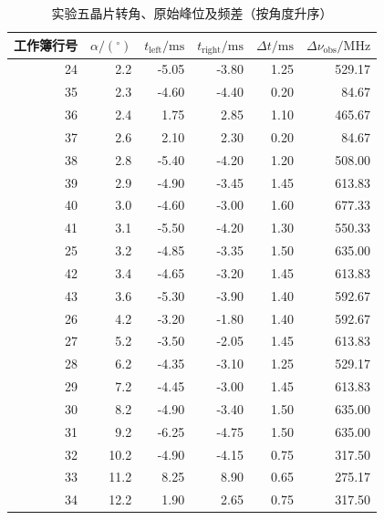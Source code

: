 \documentclass[UTF8,a4paper,10pt]{ctexart}
\begin{document}
\begin{table}[H]
 \centering
 \caption{实验五晶片转角、原始峰位及频差（按角度升序）}
 \label{tab:quartz-angle-raw}
 \small
 \begin{tabular}{rrrrrr}
 \toprule
 工作簿行号 & $\alpha/(^\circ)$ & $t_{\mathrm{left}}/\mathrm{ms}$
 & $t_{\mathrm{right}}/\mathrm{ms}$ & $\Delta t/\mathrm{ms}$ & $\Delta\nu_{\mathrm{obs}}/\mathrm{MHz}$\\
 \midrule
 24 & 2.2 & -5.05 & -3.80 & 1.25 & 529.17\\
 35 & 2.3 & -4.60 & -4.40 & 0.20 & 84.67\\
 36 & 2.4 & 1.75 & 2.85 & 1.10 & 465.67\\
 37 & 2.6 & 2.10 & 2.30 & 0.20 & 84.67\\
 38 & 2.8 & -5.40 & -4.20 & 1.20 & 508.00\\
 39 & 2.9 & -4.90 & -3.45 & 1.45 & 613.83\\
 40 & 3.0 & -4.60 & -3.00 & 1.60 & 677.33\\
 41 & 3.1 & -5.50 & -4.20 & 1.30 & 550.33\\
 25 & 3.2 & -4.85 & -3.35 & 1.50 & 635.00\\
 42 & 3.4 & -4.65 & -3.20 & 1.45 & 613.83\\
 43 & 3.6 & -5.30 & -3.90 & 1.40 & 592.67\\
 26 & 4.2 & -3.20 & -1.80 & 1.40 & 592.67\\
 27 & 5.2 & -3.50 & -2.05 & 1.45 & 613.83\\
 28 & 6.2 & -4.35 & -3.10 & 1.25 & 529.17\\
 29 & 7.2 & -4.45 & -3.00 & 1.45 & 613.83\\
 30 & 8.2 & -4.90 & -3.40 & 1.50 & 635.00\\
 31 & 9.2 & -6.25 & -4.75 & 1.50 & 635.00\\
 32 & 10.2 & -4.90 & -4.15 & 0.75 & 317.50\\
 33 & 11.2 & 8.25 & 8.90 & 0.65 & 275.17\\
 34 & 12.2 & 1.90 & 2.65 & 0.75 & 317.50\\
 \bottomrule
 \end{tabular}
\end{table}
\end{document}
